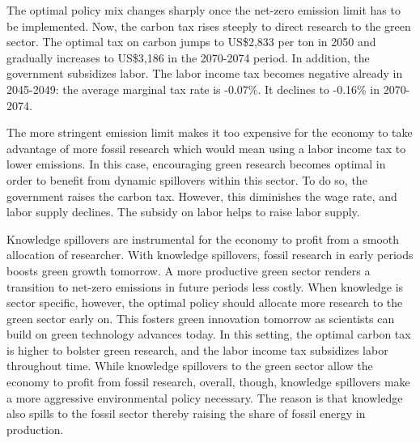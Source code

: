 The optimal policy mix changes sharply once the net-zero emission limit has to be implemented. Now, the carbon tax rises steeply to direct research to the green sector. The optimal tax on carbon jumps to US\$2,833 per ton in 2050 and gradually increases to US\$3,186 in the 2070-2074 period. In addition, the government subsidizes labor. The labor income tax becomes negative already in 2045-2049: the average marginal tax rate is -0.07\%. It declines to -0.16\% in 2070-2074.

The more stringent emission limit makes it too expensive for the economy to take advantage of more fossil research which would mean using a labor income tax to lower emissions. In this case, encouraging green research becomes optimal in order to benefit from dynamic spillovers within this sector. To do so, the government raises the carbon tax. However, this diminishes the wage rate, and labor supply declines. The subsidy on labor helps to raise labor supply.


Knowledge spillovers are instrumental for the economy to profit from a smooth allocation of researcher. With knowledge spillovers, fossil research in early periods boosts green growth tomorrow. A more productive green sector renders a transition to net-zero emissions in future periods less costly. When knowledge is sector specific, however, the optimal policy should allocate more research to the green sector early on. This fosters green innovation tomorrow as scientists can build on green technology advances today. In this setting, the optimal carbon tax is higher to bolster green research, and the labor income tax subsidizes labor throughout time. While knowledge spillovers to the green sector allow the economy to profit from fossil research, overall, though, knowledge spillovers make a more aggressive environmental policy necessary. The reason is that knowledge also spills to the fossil sector thereby raising the share of fossil energy in production.  %


